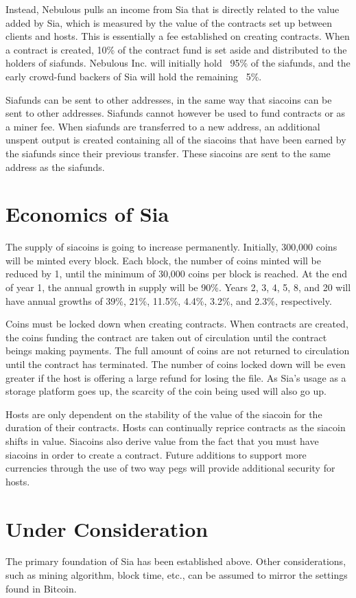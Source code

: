 \documentclass[twocolumn]{article}
\begin{document}
Instead, Nebulous pulls an income from Sia that is directly related to the value added by Sia, which is measured by the value of the contracts set up between clients and hosts.
This is essentially a fee established on creating contracts.
When a contract is created, 10\% of the contract fund is set aside and distributed to the holders of siafunds.
Nebulous Inc. will initially hold ~95\% of the siafunds, and the early crowd-fund backers of Sia will hold the remaining ~5\%.

Siafunds can be sent to other addresses, in the same way that siacoins can be sent to other addresses.
Siafunds cannot however be used to fund contracts or as a miner fee.
When siafunds are transferred to a new address, an additional unspent output is created containing all of the siacoins that have been earned by the siafunds since their previous transfer.
These siacoins are sent to the same address as the siafunds.

\section{Economics of Sia}
The supply of siacoins is going to increase permanently.
Initially, 300,000 coins will be minted every block.
Each block, the number of coins minted will be reduced by 1, until the minimum of 30,000 coins per block is reached.
At the end of year 1, the annual growth in supply will be 90\%.
Years 2, 3, 4, 5, 8, and 20 will have annual growths of 39\%, 21\%, 11.5\%, 4.4\%, 3.2\%, and 2.3\%, respectively.

Coins must be locked down when creating contracts.
When contracts are created, the coins funding the contract are taken out of circulation until the contract beings making payments.
The full amount of coins are not returned to circulation until the contract has terminated.
The number of coins locked down will be even greater if the host is offering a large refund for losing the file.
As Sia's usage as a storage platform goes up, the scarcity of the coin being used will also go up.

Hosts are only dependent on the stability of the value of the siacoin for the duration of their contracts.
Hosts can continually reprice contracts as the siacoin shifts in value.
Siacoins also derive value from the fact that you must have siacoins in order to create a contract.
Future additions to support more currencies through the use of two way pegs will provide additional security for hosts.

\section{Under Consideration}
The primary foundation of Sia has been established above.
Other considerations, such as mining algorithm, block time, etc., can be assumed to mirror the settings found in Bitcoin.
\end{document}
